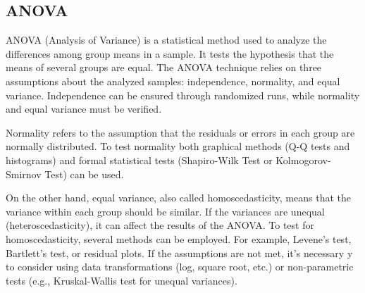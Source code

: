 \subsection{ANOVA} 

ANOVA (Analysis of Variance) is a statistical method used to analyze the differences among group means in a sample. It tests the hypothesis that the means of several groups are equal. The ANOVA technique relies on three assumptions about the analyzed samples: independence, normality, and equal variance. Independence can be ensured through randomized runs, while normality and equal variance must be verified.

Normality refers to the assumption that the residuals or errors in each group are normally distributed. To test normality both graphical methods (Q-Q tests and histograms) and formal statistical tests (Shapiro-Wilk Test or Kolmogorov-Smirnov Test) can be used. 

On the other hand, equal variance, also called homoscedasticity, means that the variance within each group should be similar. If the variances are unequal (heteroscedasticity), it can affect the results of the ANOVA. To test for homoscedasticity, several methods can be employed. For example,  Levene’s test, Bartlett’s test, or residual plots. If the assumptions are not met, it's necessary y to consider using data transformations (log, square root, etc.) or non-parametric tests (e.g., Kruskal-Wallis test for unequal variances).


